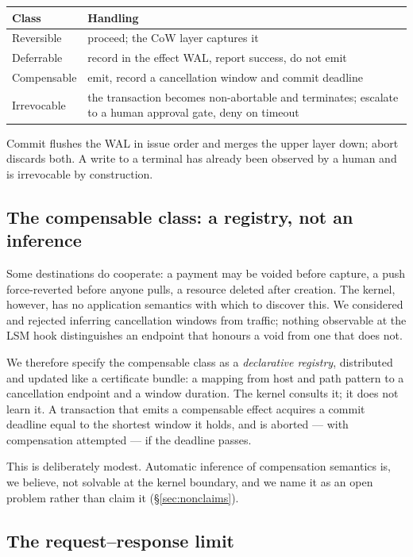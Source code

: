\documentclass[10pt,twocolumn]{article}
\begin{document}
\begin{center}
\small
\begin{tabular}{@{}lp{4.3cm}@{}}
\toprule
\textbf{Class} & \textbf{Handling}\\
\midrule
Reversible   & proceed; the CoW layer captures it\\
Deferrable   & record in the effect WAL, report success, do not emit\\
Compensable  & emit, record a cancellation window and commit deadline\\
Irrevocable  & the transaction becomes non-abortable and terminates; escalate
               to a human approval gate, deny on timeout\\
\bottomrule
\end{tabular}
\end{center}

Commit flushes the WAL in issue order and merges the upper layer down; abort
discards both. A write to a terminal has already been observed by a human and is
irrevocable by construction.

\subsection{The compensable class: a registry, not an inference}
\label{sec:compensable}

Some destinations do cooperate: a payment may be voided before capture, a push
force-reverted before anyone pulls, a resource deleted after creation. The
kernel, however, has no application semantics with which to discover this. We
considered and rejected inferring cancellation windows from traffic; nothing
observable at the LSM hook distinguishes an endpoint that honours a void from
one that does not.

We therefore specify the compensable class as a \emph{declarative registry},
distributed and updated like a certificate bundle: a mapping from host and path
pattern to a cancellation endpoint and a window duration. The kernel consults
it; it does not learn it. A transaction that emits a compensable effect acquires
a commit deadline equal to the shortest window it holds, and is aborted --- with
compensation attempted --- if the deadline passes.

This is deliberately modest. Automatic inference of compensation semantics is,
we believe, not solvable at the kernel boundary, and we name it as an open
problem rather than claim it (\S\ref{sec:nonclaims}).

\subsection{The request--response limit}
\label{sec:reqresp}
\end{document}

